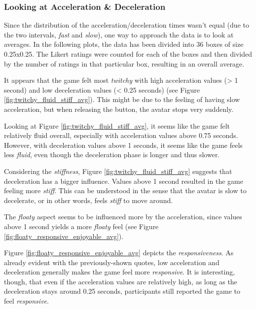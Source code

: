 
\subsubsection{Looking at Acceleration \& Deceleration}
Since the distribution of the acceleration/deceleration times wasn't equal (due to the two intervals, \textit{fast} and \textit{slow}), one way to approach the data is to look at averages. In the following plots, the data has been divided into 36 boxes of size 0.25x0.25. The Likert ratings were counted for each of the boxes and then divided by the number of ratings in that particular box, resulting in an overall average.

It appears that the game felt most \textit{twitchy} with high acceleration values (> 1 second) and low deceleration values (< 0.25 seconds) (see Figure \ref{fig:twitchy_fluid_stiff_avg}). This might be due to the feeling of having slow acceleration, but when releasing the button, the avatar stops very suddenly.

Looking at Figure \ref{fig:twitchy_fluid_stiff_avg}, it seems like the game felt relatively fluid overall, especially with acceleration values above 0.75 seconds. However, with deceleration values above 1 seconds, it seems like the game feels less \textit{fluid}, even though the deceleration phase is longer and thus slower.

Considering the \textit{stiffness}, Figure \ref{fig:twitchy_fluid_stiff_avg} suggests that deceleration has a bigger influence. Values above 1 second resulted in the game feeling more \textit{stiff}. This can be understood in the sense that the avatar is slow to decelerate, or in other words, feels \textit{stiff} to move around.

The \textit{floaty} aspect seems to be influenced more by the acceleration, since values above 1 second yields a more \textit{floaty} feel (see Figure \ref{fig:floaty_responsive_enjoyable_avg}).

Figure \ref{fig:floaty_responsive_enjoyable_avg} depicts the \textit{responsiveness}. As already evident with the previously-shown quotes, low acceleration and deceleration generally makes the game feel more \textit{responsive}. It is interesting, though, that even if the acceleration values are relatively high, as long as the deceleration stays around 0.25 seconds, participants still reported the game to feel \textit{responsive}.

